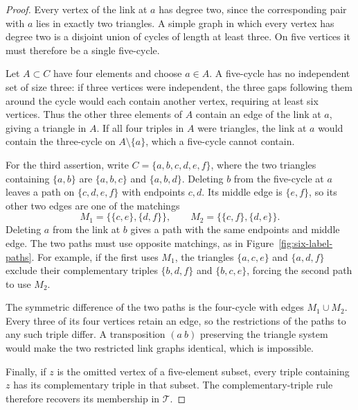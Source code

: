 \begin{proof}
Every vertex of the link at $a$ has degree two, since the corresponding
pair with $a$ lies in exactly two triangles. A simple graph in which every
vertex has degree two is a disjoint union of cycles of length at least
three. On five vertices it must therefore be a single five-cycle.

Let $A\subset C$ have four elements and choose $a\in A$. A five-cycle
has no independent set of size three: if three vertices were independent,
the three gaps following them around the cycle would each contain another
vertex, requiring at least six vertices. Thus the other three elements of
$A$ contain an edge of the link at $a$, giving a triangle in $A$. If all
four triples in $A$ were triangles, the link at $a$ would contain the
three-cycle on $A\setminus\{a\}$, which a five-cycle cannot contain.

For the third assertion, write
$C=\{a,b,c,d,e,f\}$, where the two triangles containing $\{a,b\}$ are
$\{a,b,c\}$ and $\{a,b,d\}$. Deleting $b$ from the five-cycle at $a$
leaves a path on $\{c,d,e,f\}$ with endpoints $c,d$. Its middle edge is
$\{e,f\}$, so its other two edges are one of the matchings
\[
 M_1=\bigl\{\{c,e\},\{d,f\}\bigr\},\qquad
 M_2=\bigl\{\{c,f\},\{d,e\}\bigr\}.
\]
Deleting $a$ from the link at $b$ gives a path with the same endpoints
and middle edge. The two paths must use opposite matchings, as in
Figure~\ref{fig:six-label-paths}. For example,
if the first uses $M_1$, the triangles $\{a,c,e\}$ and $\{a,d,f\}$
exclude their complementary triples $\{b,d,f\}$ and $\{b,c,e\}$,
forcing the second path to use $M_2$.

The symmetric difference of the two paths is the four-cycle with edges
$M_1\cup M_2$. Every three of its four vertices retain an edge, so the
restrictions of the paths to any such triple differ. A transposition
$(a\ b)$ preserving the triangle system would make the two restricted
link graphs identical, which is impossible.

Finally, if $z$ is the omitted vertex of a five-element subset, every
triple containing $z$ has its complementary triple in that subset.
The complementary-triple rule therefore recovers its membership in
$\mathcal T$.
\end{proof}



